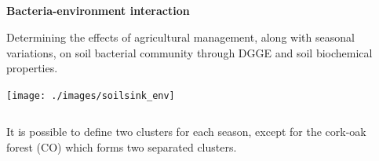 \documentclass[10pt]{beamer}
\begin{document}
\subsection{}
\begin{frame}
	\textbf{\Large{Bacteria-environment interaction}}
	\begin{block}{}
		Determining the effects of agricultural management, along with seasonal variations, on soil bacterial community through DGGE and soil biochemical properties.
	\end{block}
	\begin{center}
		\texttt{[image: ./images/soilsink\_env]}	
	\end{center}
	\begin{columns}
		\begin{column}{0.5\textwidth}
			It is possible to define two clusters for each season, except for the cork-oak forest (CO) which forms two separated clusters.
		\end{column}
		\begin{column}{0.5\textwidth}
		\end{column}
	\end{columns}
\end{frame}
\end{document}
